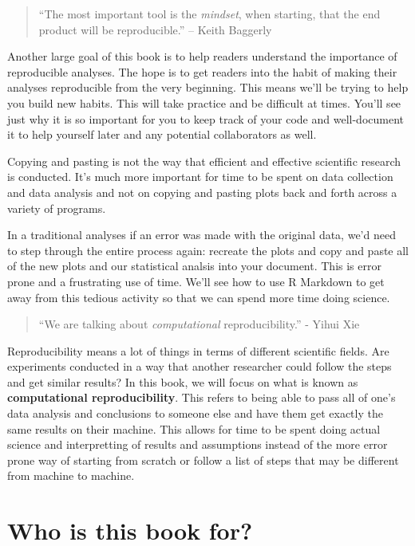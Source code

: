 \documentclass[]{tufte-book}
\begin{document}
\begin{quote}
``The most important tool is the \emph{mindset}, when starting, that the
end product will be reproducible.'' -- Keith Baggerly
\end{quote}

Another large goal of this book is to help readers understand the
importance of reproducible analyses. The hope is to get readers into the
habit of making their analyses reproducible from the very beginning.
This means we'll be trying to help you build new habits. This will take
practice and be difficult at times. You'll see just why it is so
important for you to keep track of your code and well-document it to
help yourself later and any potential collaborators as well.

Copying and pasting is not the way that efficient and effective
scientific research is conducted. It's much more important for time to
be spent on data collection and data analysis and not on copying and
pasting plots back and forth across a variety of programs.

In a traditional analyses if an error was made with the original data,
we'd need to step through the entire process again: recreate the plots
and copy and paste all of the new plots and our statistical analsis into
your document. This is error prone and a frustrating use of time. We'll
see how to use R Markdown to get away from this tedious activity so that
we can spend more time doing science.

\begin{quote}
``We are talking about \emph{computational} reproducibility.'' - Yihui
Xie
\end{quote}

Reproducibility means a lot of things in terms of different scientific
fields. Are experiments conducted in a way that another researcher could
follow the steps and get similar results? In this book, we will focus on
what is known as \textbf{computational reproducibility}. This refers to
being able to pass all of one's data analysis and conclusions to someone
else and have them get exactly the same results on their machine. This
allows for time to be spent doing actual science and interpretting of
results and assumptions instead of the more error prone way of starting
from scratch or follow a list of steps that may be different from
machine to machine.

\section{Who is this book for?}\label{who-is-this-book-for}
\end{document}
